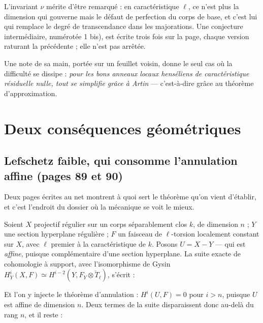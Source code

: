 \documentclass[11pt,a4paper]{article}
\begin{document}
L'invariant $\nu$ mérite d'être remarqué : en caractéristique $\ell$, ce n'est
plus la dimension qui gouverne mais le défaut de perfection du corps de base, et
c'est lui qui remplace le degré de transcendance dans les majorations. Une
conjecture intermédiaire, numérotée 1 bis), est écrite trois fois sur la page,
chaque version raturant la précédente ; elle n'est pas arrêtée.

Une note de sa main, portée sur un feuillet voisin, donne le seul cas où la
difficulté se dissipe : \emph{pour les bons anneaux locaux henséliens de
caractéristique résiduelle nulle, tout se simplifie grâce à Artin} — c'est-à-dire
grâce au théorème d'approximation.

\section*{Deux conséquences géométriques}

\subsection*{Lefschetz faible, qui consomme l'annulation affine (pages 89 et 90)}

Deux pages écrites au net montrent à quoi sert le théorème qu'on vient
d'établir, et c'est l'endroit du dossier où la mécanique se voit le mieux.

Soient $X$ projectif régulier sur un corps séparablement clos $k$, de dimension
$n$ ; $Y$ une section hyperplane régulière ; $F$ un faisceau de $\ell$-torsion
localement constant sur $X$, avec $\ell$ premier à la caractéristique de $k$.
Posons $U = X - Y$ — qui est \emph{affine}, puisque complémentaire d'une section
hyperplane. La suite exacte de cohomologie à support, avec l'isomorphisme de
Gysin $H^i_Y(X,F) \simeq H^{i-2}(Y, F_Y \otimes \check{T}_{\ell})$, s'écrit :


Et l'on y injecte le théorème d'annulation : $H^i(U,F) = 0$ pour $i > n$,
puisque $U$ est affine de dimension $n$. Deux termes de la suite disparaissent
donc au-delà du rang $n$, et il reste :
\end{document}
